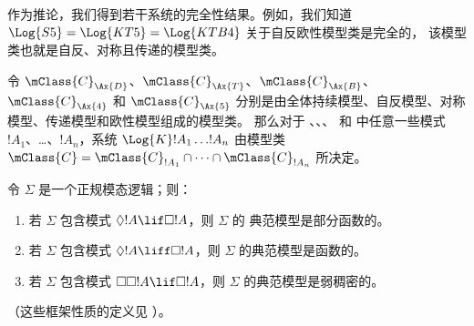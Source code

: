 \documentclass[../../../include/open-logic-section]{subfiles}
\begin{document}
作为推论，我们得到若干系统的完全性结果。例如，我们知道 $\Log{S5}
= \Log{KT5} = \Log{KTB4}$ 关于自反欧性模型类是完全的，
该模型类也就是自反、对称且传递的模型类。

\begin{thm}
  令 $\mClass{C}_\Ax{D}$、$\mClass{C}_\Ax{T}$、$\mClass{C}_\Ax{B}$、
  $\mClass{C}_\Ax{4}$ 和 $\mClass{C}_\Ax{5}$ 分别是由全体持续模型、自反模型、对称模型、传递模型和欧性模型组成的模型类。
  那么对于 、、、 和  中任意一些模式
  $!A_1$、\dots、$!A_n$，系统 $\Log{K}!A_1 \dots !A_n$ 由模型类
  $\mClass{C} = \mClass{C}_{!A_1} \cap \dots \cap \mClass{C}_{!A_n}$
  所决定。
\end{thm}

\begin{prop}
  令 $\Sigma$ 是一个正规模态逻辑；则：
  \begin{enumerate}
  \item{}%
    若 $\Sigma$ 包含模式 $\Diamond!A \lif \Box !A$，则 $\Sigma$ 的
    典范模型是部分函数的。
  \item 若 $\Sigma$ 包含模式 $\Diamond!A \liff \Box !A$，则
    $\Sigma$ 的典范模型是函数的。
  \item 若 $\Sigma$ 包含模式 $\Box\Box!A \lif \Box !A$，则
    $\Sigma$ 的典范模型是弱稠密的。
  \end{enumerate}
（这些框架性质的定义见 ）。
\end{prop}
\end{document}
